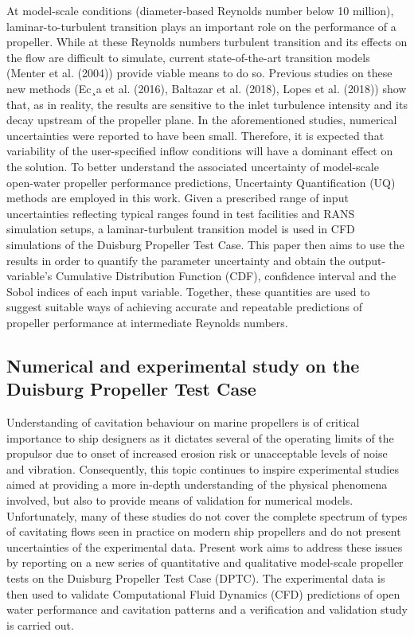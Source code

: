 \documentclass[a4paper,10pt]{article}
\begin{document}
	At model-scale conditions (diameter-based Reynolds number below 10 million), laminar-to-turbulent transition plays an important role on the performance of a propeller. While at these Reynolds numbers turbulent transition and its effects on the flow are difficult to simulate, current state-of-the-art transition models (Menter et al. (2004)) provide viable means to do so. Previous studies on these new methods (Ec¸a et al. (2016), Baltazar et al. (2018), Lopes et al. (2018)) show that, as in reality, the results are sensitive to the inlet turbulence intensity and its decay upstream of the propeller plane. In the aforementioned studies, numerical uncertainties were reported to have been small. Therefore, it is expected that variability of the user-specified inflow conditions will have a dominant effect on the solution. To better understand the associated uncertainty of model-scale open-water propeller performance predictions, Uncertainty Quantification (UQ) methods are employed in this work. Given a prescribed range of input uncertainties reflecting typical ranges found in test facilities and RANS simulation setups, a laminar-turbulent transition model is used in CFD simulations of the Duisburg Propeller Test Case. This paper then aims to use the results in order to quantify the parameter uncertainty and obtain the output-variable’s Cumulative Distribution Function (CDF), confidence interval and the Sobol indices of each input variable. Together, these quantities are used to suggest suitable ways of achieving accurate and repeatable predictions of propeller performance at intermediate Reynolds numbers.

\subsection{Numerical and experimental study on the Duisburg Propeller Test Case \cite{Wielgosz2019}}

	Understanding of cavitation behaviour on marine propellers is of critical importance to ship designers as it dictates several of the operating limits of the propulsor due to onset of increased erosion risk or unacceptable levels of noise and vibration. Consequently, this topic continues to inspire experimental studies aimed at providing a more in-depth understanding of the physical phenomena involved, but also to provide means of validation for numerical models. Unfortunately, many of these studies do not cover the complete spectrum of types of cavitating flows seen in practice on modern ship propellers and do not present uncertainties of the experimental data. Present work aims to address these issues by reporting on a new series of quantitative and qualitative model-scale propeller tests on the Duisburg Propeller Test Case (DPTC). The experimental data is then used to validate Computational Fluid Dynamics (CFD) predictions of open water performance and cavitation patterns and a verification and validation study is carried out.
\end{document}
